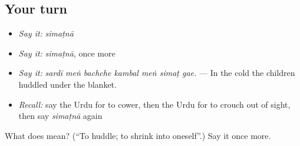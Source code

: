 \subsection*{Your turn}
\begin{itemize}
\raggedright
  \item \emph{Say it:} \emph{simaṭnā}
  \item \emph{Say it:} \emph{simaṭnā}, once more
  \item \emph{Say it:} \emph{sardī meṅ bachche kambal meṅ simaṭ gae.} — In the cold the children huddled under the blanket.
  \item \emph{Recall:} say the Urdu for to cower, then the Urdu for to crouch out of sight, then say \emph{simaṭnā} again
\end{itemize}

\begin{tcolorbox}[breakable,colback=teal!4,colframe=teal!35!black,title={Before you move on}]
What does  mean? (\textquotedblleft{}To huddle; to shrink into oneself\textquotedblright{}.) Say it once more.
\end{tcolorbox}
